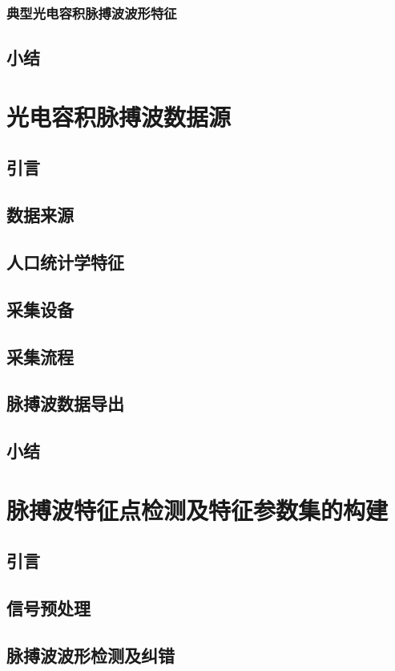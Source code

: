 \subsection{典型光电容积脉搏波波形特征}
\section{小结}

\chapter{光电容积脉搏波数据源}
\section{引言}
\section{数据来源}
\section{人口统计学特征}
\section{采集设备}
\section{采集流程}
\section{脉搏波数据导出}
\section{小结}


\chapter{脉搏波特征点检测及特征参数集的构建}
\section{引言}
\section{信号预处理}
\section{脉搏波波形检测及纠错}
